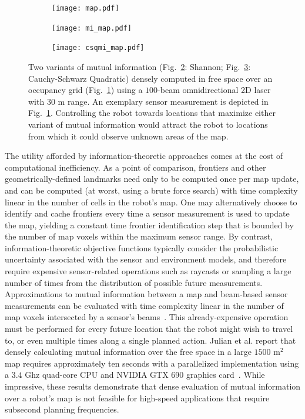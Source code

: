 \begin{figure}[t]
    \centering
    \begin{subfigure}[t]{0.31\textwidth}
        \centering
        \texttt{[image: map.pdf]}
        \caption{\label{fig:og}}
    \end{subfigure}
    \begin{subfigure}[t]{0.31\textwidth}
        \centering
        \texttt{[image: mi\_map.pdf]}
        \caption{\label{fig:og_mi}}
    \end{subfigure}
    \begin{subfigure}[t]{0.31\textwidth}
        \centering
        \texttt{[image: csqmi\_map.pdf]}
        \caption{\label{fig:og_csqmi}}
    \end{subfigure}
    \caption[Maximizing mutual information drives a robot to unexplored areas.]{Two variants of mutual information (Fig.~\ref{fig:og_mi}: Shannon;
    Fig.~\ref{fig:og_csqmi}: Cauchy-Schwarz Quadratic) densely computed in free space
  over an occupancy grid (Fig.~\ref{fig:og}) using a $100$-beam omnidirectional 2D
laser with $30$ m range. An exemplary sensor measurement is depicted in
Fig.~\ref{fig:og}. Controlling the robot towards locations that maximize either variant
of mutual information would attract the robot to locations from which it
could observe unknown areas of the map. \label{fig:mi_vs_csqmi}}
\end{figure}

The utility afforded by information-theoretic approaches comes at the cost of
computational inefficiency.
As a point of comparison, frontiers and other geometrically-defined landmarks
need only to be computed once per map update, and can be computed (at worst, using a brute force search)
with time complexity linear in the number of cells in the robot's map.
One may alternatively choose to identify and cache frontiers every time a sensor
measurement is used to update the map, yielding a constant time frontier
identification step that is bounded by the number of map voxels within the maximum sensor range.
By contrast, information-theoretic objective functions typically consider the probabilistic
uncertainty associated with the sensor and environment models, and therefore
require expensive sensor-related operations such as raycasts or sampling a large
number of times from the distribution of possible future measurements.
Approximations to mutual information between a map and beam-based sensor
measurements can be evaluated with time complexity linear in the number of map
voxels intersected by a sensor's
beams~\cite{julian2013mutualthesis,charrow2015icra,nelson2015iros}. This
already-expensive operation must be performed for every future location that the
robot might wish to travel to, or even multiple times along a single planned
action. Julian et al. report that densely calculating
mutual information over the free space in a large $1500$ m$^{2}$ map requires
approximately ten seconds with a parallelized implementation using a $3.4$ Ghz
quad-core CPU and NVIDIA GTX 690 graphics card~\cite{julian2013mutual}. While
impressive, these results demonstrate that dense evaluation of mutual
information over a robot's map is not feasible for high-speed applications that
require subsecond planning frequencies.

